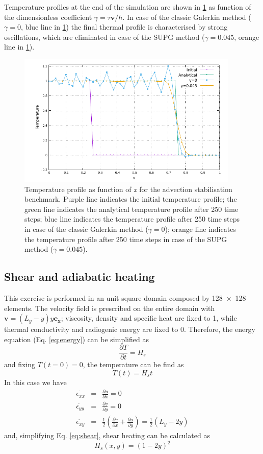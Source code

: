 \documentclass[hidelinks,10pt,a4paper]{article}
\begin{document}
Temperature profiles at the end of the simulation are shown in \ref{fig:advection} as function of the dimensionless coefficient $\gamma=\tau \bm{v}/h$. In case
of the classic Galerkin method ($\gamma=0$, blue line in \ref{fig:advection}) the final thermal profile is characterised by strong oscillations, which are
eliminated in case of the SUPG method ($\gamma=0.045$, orange line in \ref{fig:advection}).

\begin{figure}
\centering
\noindent\includegraphics[width=400px]{./Figures/Advection.pdf}
\caption{Temperature profile as function of \textit{x} for the advection stabilisation benchmark. Purple line indicates the initial temperature profile; the
green line indicates the analytical temperature profile after 250 time steps; blue line indicates the temperature profile after 250 time steps in case of the
classic Galerkin method ($\gamma=0$); orange line indicates the temperature profile after 250 time steps in case of the SUPG method ($\gamma=0.045$).}
\label{fig:advection}
\end{figure}

\subsection{Shear and adiabatic heating}\label{sec:simple_shear}
This exercise is performed in an unit square domain composed by \num{128x128} elements. The velocity field is prescribed on the entire domain with
$\bm{v}=(L_y-y)y\bm{e_x}$; viscosity, density and specific heat are fixed to 1, while thermal conductivity and radiogenic energy are fixed to 0. Therefore,
the energy equation (Eq. \ref{eq:energy}) can be simplified as \[\frac{\partial T}{\partial t}=H_s\] and fixing $T(t=0)=0$, the temperature can be find as
\[T(t)=H_s t\]
In this case we have
\begin{eqnarray}
\dot{\epsilon_{xx}}&=&\frac{\partial u}{\partial x}=0 \nonumber \\
\dot{\epsilon_{yy}}&=&\frac{\partial v}{\partial y}=0 \nonumber \\
\dot{\epsilon_{xy}}&=&\frac{1}{2}\left(\frac{\partial v}{\partial x}+\frac{\partial u}{\partial y}\right)=\frac{1}{2}(L_y-2y)\nonumber
\end{eqnarray}
and, simplifying Eq. \ref{eq:shear}, shear heating can be calculated as \[H_s(x,y)=(1-2y)^2\]
\end{document}
